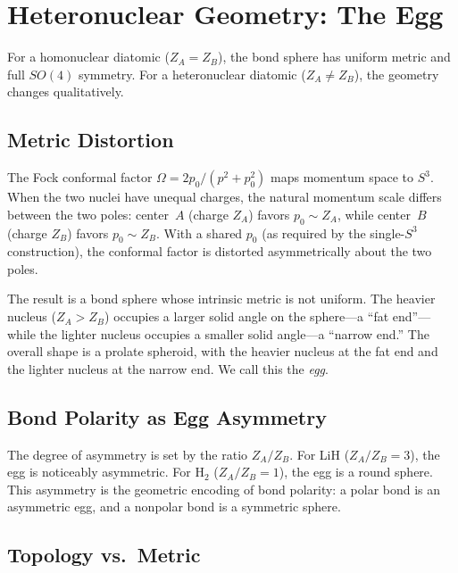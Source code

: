 \documentclass[aps,pra,twocolumn,superscriptaddress,longbibliography]{revtex4-2}
\begin{document}
\section{Heteronuclear Geometry: The Egg}
\label{sec:heteronuclear}

For a homonuclear diatomic ($Z_A = Z_B$), the bond sphere has uniform
metric and full $SO(4)$ symmetry.  For a heteronuclear diatomic
($Z_A \neq Z_B$), the geometry changes qualitatively.

\subsection{Metric Distortion}

The Fock conformal factor $\Omega = 2p_0/(p^2 + p_0^2)$ maps
momentum space to $S^3$.  When the two nuclei have unequal charges,
the natural momentum scale differs between the two poles: center~$A$
(charge $Z_A$) favors $p_0 \sim Z_A$, while center~$B$ (charge $Z_B$)
favors $p_0 \sim Z_B$.  With a shared $p_0$ (as required by the
single-$S^3$ construction), the conformal factor is distorted
asymmetrically about the two poles.

The result is a bond sphere whose intrinsic metric is not uniform.
The heavier nucleus ($Z_A > Z_B$) occupies a larger solid angle on the
sphere---a ``fat end''---while the lighter nucleus occupies a smaller
solid angle---a ``narrow end.''  The overall shape is a prolate
spheroid, with the heavier nucleus at the fat end and the lighter
nucleus at the narrow end.  We call this the \emph{egg}.

\subsection{Bond Polarity as Egg Asymmetry}

The degree of asymmetry is set by the ratio $Z_A/Z_B$.  For LiH
($Z_A/Z_B = 3$), the egg is noticeably asymmetric.  For H$_2$
($Z_A/Z_B = 1$), the egg is a round sphere.  This asymmetry is
the geometric encoding of bond polarity: a polar bond is an
asymmetric egg, and a nonpolar bond is a symmetric sphere.

\subsection{Topology vs.\ Metric}
\end{document}
